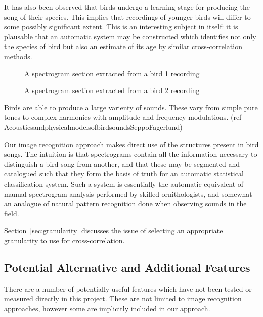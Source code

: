 It has also been observed that birds undergo a learning stage for producing the
song of their species.
This implies that recordings of younger birds will differ to some possibly
significant extent.
This is an interesting subject in itself: it is plausable that an automatic
system may be constructed which identifies not only the species of bird but also
an estimate of its age by similar cross-correlation methods.

\begin{figure}[t!]
  \centering
  \begin{subfigure}[t]{0.5\textwidth}
    \centering

    \caption{}
  \end{subfigure}
  \begin{subfigure}[t]{0.5\textwidth}
    \centering

    \caption{}
  \end{subfigure}
  \caption{A spectrogram section extracted from a bird 1 recording}
\end{figure}

\begin{figure}
  \centering

  \caption{A spectrogram section extracted from a bird 2 recording}
\end{figure}

Birds are able to produce a large varienty of sounds.
These vary from simple pure tones to complex harmonics with amplitude and
frequency modulations. (ref AcousticsandphysicalmodelsofbirdsoundsSeppoFagerlund)

Our image recognition approach makes direct use of the structures present
in bird songs.
The intuition is that spectrograms contain all the information necessary to
distinguish a bird song from another, and that these may be segmented and
catalogued such that they form the basis of truth for an automatic statistical
classification system.
Such a system is essentially the automatic equivalent of manual spectrogram 
analysis performed by skilled ornithologists, and somewhat an analogue of natural
pattern recognition done when observing sounds in the field.

Section~\ref{sec:granularity} discusses the issue of selecting an appropriate
granularity to use for cross-correlation.

\subsection{Potential Alternative and Additional Features}
There are a number of potentially useful features which have not been tested or
measured directly in this project.
These are not limited to image recognition approaches, however some are
implicitly included in our approach.

